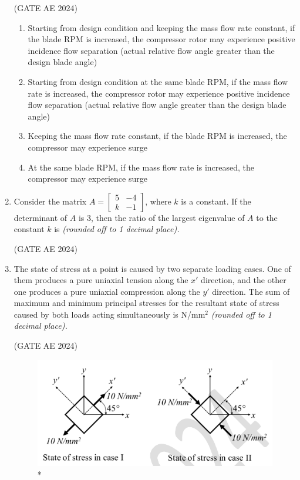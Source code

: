 \documentclass[journal,12pt,onecolumn]{IEEEtran}
\theoremstyle{remark}
\begin{document}
\begin{flushleft}
\begin{enumerate}
\hfill (GATE AE 2024)

\begin{enumerate}
\item Starting from design condition and keeping the mass flow rate constant, if the blade RPM is increased, the compressor rotor may experience positive incidence flow separation (actual relative flow angle greater than the design blade angle)  
\item Starting from design condition at the same blade RPM, if the mass flow rate is increased, the compressor rotor may experience positive incidence flow separation (actual relative flow angle greater than the design blade angle)  
\item Keeping the mass flow rate constant, if the blade RPM is increased, the compressor may experience surge  
\item At the same blade RPM, if the mass flow rate is increased, the compressor may experience surge  
\end{enumerate}

\item Consider the matrix $A = \begin{bmatrix} 5 & -4 \\ k & -1 \end{bmatrix}$, where $k$ is a constant. If the determinant of $A$ is 3, then the ratio of the largest eigenvalue of $A$ to the constant $k$ is \underline{\hspace{3cm}} \textit{(rounded off to 1 decimal place).} 

\hfill (GATE AE 2024)

\item The state of stress at a point is caused by two separate loading cases. One of them produces a pure uniaxial tension along the $x'$ direction, and the other one produces a pure uniaxial compression along the $y'$ direction. The sum of maximum and minimum principal stresses for the resultant state of stress caused by both loads acting simultaneously is \underline{\hspace{3cm}} N/mm$^2$ \textit{(rounded off to 1 decimal place).}

\hfill (GATE AE 2024)

\begin{figure}
\includegraphics[width=0.8\columnwidth]{figs/52.png}
\caption{*}
    \label{fig:placeholder}
\end{figure}



\end{enumerate}
\end{flushleft}
\end{document}
